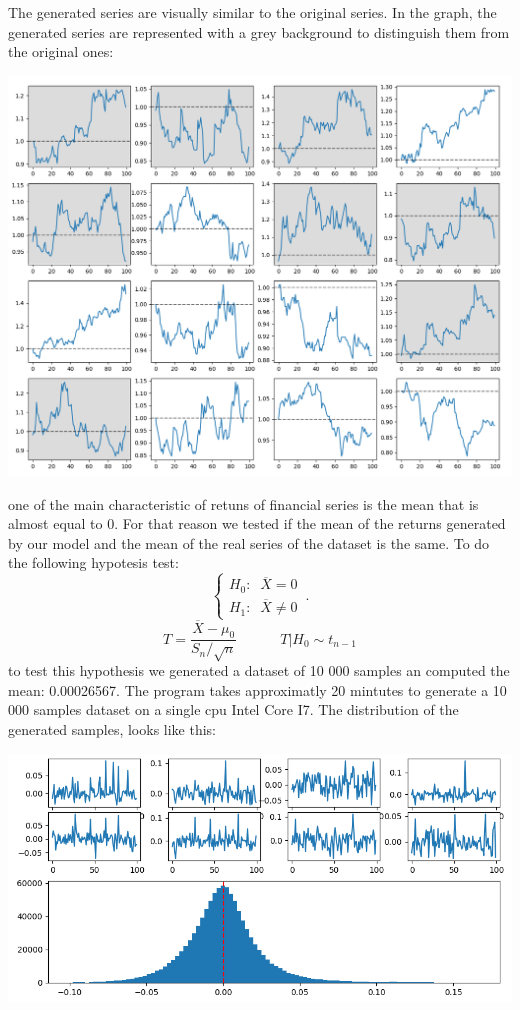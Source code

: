 \documentclass{article}
\begin{document}
    \newpage
    The generated series are visually similar to the original series. In the graph, the generated series are represented with a grey background to distinguish them from the original ones:
    \begin{center}
        \includegraphics[scale=0.5]{imgs/series_comparison_README.png}
    \end{center}
    one of the main characteristic of retuns of financial series is the mean that is almost equal to 0. For that reason we tested if the mean of the returns generated by our model and the mean 
    of the real series of the dataset is the same. To do the following hypotesis test:
    \begin{equation}
        \begin{cases}
        H_0: \;\; \overline{X}=0\\
        H_1: \;\; \overline{X} \neq 0
    \end{cases}\,.
    \end{equation}
    $$T=\frac{\overline{X}-\mu_0}{S_n/\sqrt{n}} \;\;\;\;\;\;\;\;\;\;\; T|H_0 \sim t_{n-1}$$
    to test this hypothesis we generated a dataset of 10 000 samples an computed the mean: 0.00026567.
    \newpage
    The program takes approximatly 20 mintutes to generate a 10 000 samples dataset on a single cpu Intel Core I7. The distribution of the generated samples, looks like this:
    \begin{center}
        \includegraphics[scale=0.7]{imgs/generated.png}
    \end{center}
\end{document}
